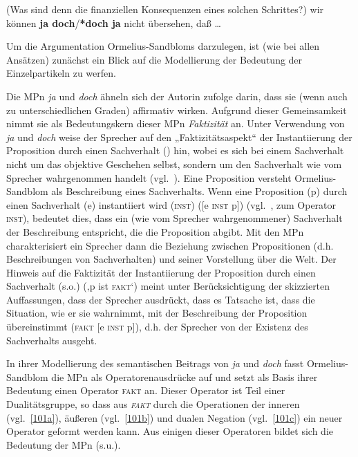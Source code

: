 \begin{exe}
	\ex\label{100} 
	(Was sind denn die finanziellen Konsequenzen eines solchen Schrittes?) wir können \textbf{ja doch}/\textbf{*doch ja} nicht übersehen, daß \ldots
	\newline
	\hbox{}\hfill\hbox{\citet[93]{Ormelius-Sandblom1997}}	
\end{exe}
Um die Argumentation Ormelius-Sandbloms darzulegen, ist (wie bei allen Ansätzen) zunächst ein Blick auf die Modellierung der Bedeutung der Einzelpartikeln zu werfen.

Die MPn \textit{ja} und \textit{doch} ähneln sich der Autorin zufolge darin, dass sie (wenn auch zu unterschiedlichen Graden) affirmativ wirken. Aufgrund dieser Gemeinsamkeit nimmt sie als Bedeutungskern dieser MPn \textit{Faktizität} an. Unter Verwendung von \textit{ja} und \textit{doch} weise der Sprecher auf den „Faktizitätsaspekt“ der Instantiierung der Proposition durch einen Sachverhalt (\citeyear[80]{Ormelius-Sandblom1997}) hin, wobei es sich bei einem Sachverhalt nicht um das objektive Geschehen selbst, sondern um den Sachverhalt wie vom Sprecher wahrgenommen handelt (vgl.\ \citealt[99]{Rehbock1992}). Eine Proposition versteht Ormelius-Sandblom als Beschreibung eines Sachverhalts. Wenn eine Proposition (p) durch einen Sachverhalt (e) instantiiert wird (\textsc{inst}) ([e \textsc{inst} p]) (vgl.\ \citealt[23]{Bierwisch1988}, \citealt[35--36]{Brandt1992b} zum Operator \textsc{inst}), bedeutet dies, dass ein (wie vom Sprecher wahrgenommener) Sachverhalt der Beschreibung entspricht, die die Proposition abgibt. Mit den MPn charakterisiert ein Sprecher dann die Beziehung zwischen Propositionen (d.h. Beschreibungen von Sachverhalten) und seiner Vorstellung über die Welt. Der Hinweis auf die Faktizität der Instantiierung der Proposition durch einen Sachverhalt (s.o.) (‚p ist \textsc{fakt}‘) meint unter Berücksichtigung der skizzierten Auffassungen, dass der Sprecher ausdrückt, dass es Tatsache ist, dass die Situation, wie er sie wahrnimmt, mit der Beschreibung der Proposition übereinstimmt (\textsc{fakt} [e \textsc{inst} p]), d.h. der Sprecher von der Existenz des Sachverhalts ausgeht.

In ihrer Modellierung des semantischen Beitrags von \textit{ja} und \textit{doch} fasst Or\-me\-li\-us-Sandblom die MPn als Operatorenausdrücke auf und setzt als Basis ihrer Bedeutung einen Operator  \textsc{fakt} an. Dieser Operator ist Teil einer Dualitätsgruppe, so dass aus \textit{\textsc{fakt}} durch die Operationen der inneren (vgl.\ \ref{101a}), äußeren (vgl.\ \ref{101b}) und dualen Negation (vgl.\ \ref{101c}) ein neuer Operator geformt werden kann. Aus einigen dieser Operatoren bildet sich die Bedeutung der MPn (s.u.).


